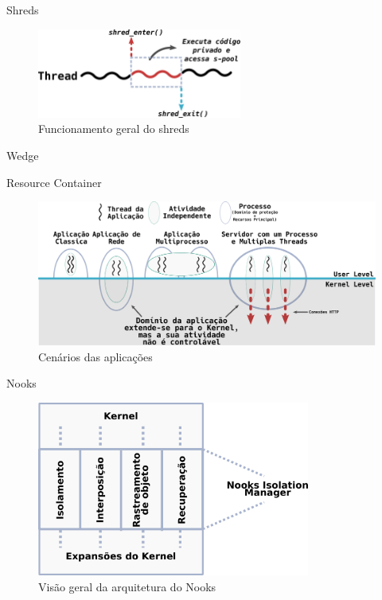 \documentclass[xcolor={usenames,svgnames,dvipsnames},brazil,english,12pt,aspectratio=149]{beamer}
\begin{document}
\begin{frame}{Shreds}
	\begin{figure}[!h]
		\centering
		\includegraphics[width=0.6\textwidth]{shreds} 
		\caption{Funcionamento geral do shreds}
		\label{fig:shreds}
	\end{figure}
\end{frame}

\begin{frame}{Wedge}
\end{frame}

\begin{frame}{Resource Container}
	\begin{figure}[!h]
		\centering
		\includegraphics[width=\textwidth]{resource_constainer_scenarios} 
		\caption{Cenários das aplicações}
		\label{fig:resource_constainer_scenarios}
	\end{figure}
\end{frame}

\begin{frame}{Nooks}
	\begin{figure}[!h]
		\centering
		\includegraphics[width=0.8\textwidth]{nooks_nim}
		\caption[Visão geral da arquitetura do Nooks]{Visão geral da arquitetura do Nooks}
		\label{fig:nooks_nim}
	\end{figure}
\end{frame}
\end{document}
